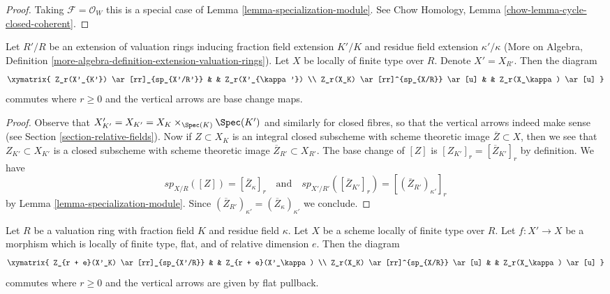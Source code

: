\begin{proof}
Taking $\mathcal{F} = \mathcal{O}_W$ this is a special case of
Lemma \ref{lemma-specialization-module}. See
Chow Homology, Lemma \ref{chow-lemma-cycle-closed-coherent}.
\end{proof}

\begin{lemma}
\label{lemma-specialization-extension}
Let $R'/R$ be an extension of valuation rings inducing fraction field
extension $K'/K$ and residue field extension $\kappa'/\kappa$
(More on Algebra, Definition
\ref{more-algebra-definition-extension-valuation-rings}).
Let $X$ be locally of finite type over $R$. Denote $X' = X_{R'}$.
Then the diagram
$$
\xymatrix{
Z_r(X'_{K'}) \ar[rr]_{sp_{X'/R'}} & & Z_r(X'_{\kappa'}) \\
Z_r(X_K) \ar[rr]^{sp_{X/R}} \ar[u] & & Z_r(X_\kappa) \ar[u]
}
$$
commutes where $r \geq 0$ and the vertical arrows are base change maps.
\end{lemma}

\begin{proof}
Observe that $X'_{K'} = X_{K'} = X_K \times_{\Spec(K)} \Spec(K')$
and similarly for closed fibres, so that the vertical arrows indeed
make sense (see Section \ref{section-relative-fields}).
Now if $Z \subset X_K$ is an integral closed subscheme with
scheme theoretic image $\overline{Z} \subset X$, then we see that
$Z_{K'} \subset X_{K'}$ is a closed subscheme with scheme theoretic
image $\overline{Z}_{R'} \subset X_{R'}$. The base change of
$[Z]$ is $[Z_{K'}]_r = [\overline{Z}_{K'}]_r$ by definition. We have
$$
sp_{X/R}([Z]) = [\overline{Z}_\kappa]_r
\quad\text{and}\quad
sp_{X'/R'}([\overline{Z}_{K'}]_r) = [(\overline{Z}_{R'})_{\kappa'}]_r
$$
by Lemma \ref{lemma-specialization-module}. Since
$(\overline{Z}_{R'})_{\kappa'} = (\overline{Z}_\kappa)_{\kappa'}$
we conclude.
\end{proof}

\begin{lemma}
\label{lemma-specialization-flat-pullback}
Let $R$ be a valuation ring with fraction field $K$ and residue field $\kappa$.
Let $X$ be a scheme locally of finite type over $R$.
Let $f : X' \to X$ be a morphism which is locally of finite type, flat,
and of relative dimension $e$. 
Then the diagram
$$
\xymatrix{
Z_{r + e}(X'_K) \ar[rr]_{sp_{X'/R}} & & Z_{r + e}(X'_\kappa) \\
Z_r(X_K) \ar[rr]^{sp_{X/R}} \ar[u] & & Z_r(X_\kappa) \ar[u]
}
$$
commutes where $r \geq 0$ and the vertical arrows are given
by flat pullback.
\end{lemma}


